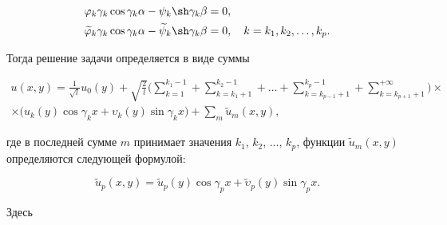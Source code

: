 \begin{equation}

\label{K:eq42}

\begin{aligned}

& \varphi_k \gamma_k \cos \gamma_k \alpha - \psi_k \sh \gamma_k \beta =0 ,\\

& \widetilde{\varphi}_k \gamma_k \cos \gamma_k \alpha - \widetilde{\psi}_k \sh \gamma_k \beta =0, \quad k=k_1,k_2,\ldots,k_p.

\end{aligned}

\end{equation}

Тогда решение задачи определяется в виде суммы

\begin{multline}

\label{K:eq43}

u(x,y)=\frac{1}{\sqrt{l}}u_0(y) +\sqrt{\frac{2}{l}}

\biggl(\sum \limits_{k=1}^{k_1-1} +\sum \limits_{k=k_1+1}^{k_2-1}+ \ldots +\sum \limits_{k=k_{p-1} +1}^{k_p-1} + \sum \limits_{k=k_{p+1}+1}^{+\infty} \biggr) \times \\

\times \bigl(u_k(y) \cos \gamma_k x +\upsilon_k(y) \sin \gamma_k x \bigr) + \sum \limits_m \widetilde{u}_m (x,y),

\end{multline}

где в последней сумме $m$ принимает значения $k_1$, $k_2$, $\ldots$, $k_p$, функции $\widetilde{u}_m (x,y)$ определяются следующей формулой:

\begin{equation}

\label{K:eq44}

\widetilde{u}_p(x,y)=\widetilde{u}_p(y) \cos \gamma_p x+\widetilde{\upsilon}_p (y) \sin \gamma_p x.

\end{equation}

Здесь

